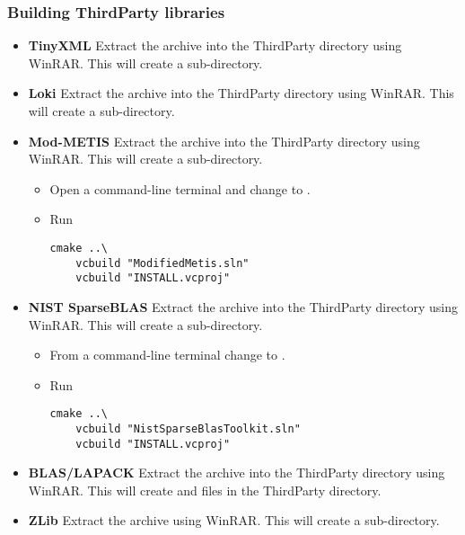 \subsubsection{Building ThirdParty libraries}
\begin{itemize}
\item \textbf{TinyXML} Extract the  archive into
the ThirdParty directory using WinRAR. This will create a 
sub-directory.
\item \textbf{Loki} Extract the  archive into the
ThirdParty directory using WinRAR. This will create a 
sub-directory.
\item \textbf{Mod-METIS} Extract the  archive
into the ThirdParty directory using WinRAR. This will create a
 sub-directory.
\begin{itemize}
  \item Open a command-line terminal and change to
   .
  \item Run
    \begin{lstlisting}[style=BashInputStyle]
    cmake ..\
    vcbuild "ModifiedMetis.sln"
    vcbuild "INSTALL.vcproj"
    \end{lstlisting}
\end{itemize}
\item \textbf{NIST SparseBLAS} Extract the  archive
into the ThirdParty directory using WinRAR. This will create a
\inlsh{spblastk0.9b} sub-directory.
\begin{itemize}
  \item From a command-line terminal change to
  .
  \item Run
    \begin{lstlisting}[style=BashInputStyle]
    cmake ..\
    vcbuild "NistSparseBlasToolkit.sln"
    vcbuild "INSTALL.vcproj"
    \end{lstlisting}
\end{itemize}
\item \textbf{BLAS/LAPACK} Extract the  archive
into the ThirdParty directory using WinRAR. This will create
\inlsh{blas\_win32.*} and \inlsh{lapack\_win32.*} files in the ThirdParty
directory.

\item \textbf{ZLib} Extract the  archive using
WinRAR. This will create a  sub-directory.


\end{itemize}
